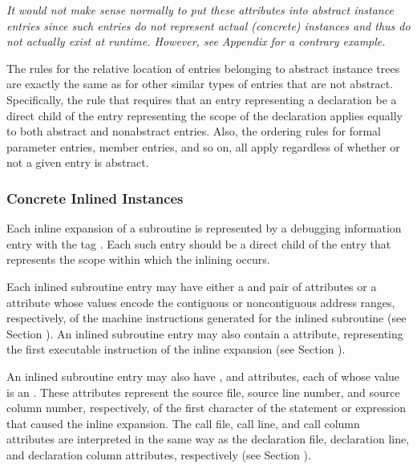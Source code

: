 \textit{It would not make sense normally to put these attributes into
abstract instance entries since such entries do not represent
actual (concrete) instances and thus do not actually exist at
run\dash time.  However, 
see Appendix  
for a contrary example.}

The rules for the relative location of entries belonging to
abstract instance trees are exactly the same as for other
similar types of entries that are not abstract. Specifically,
the rule that requires that an entry representing a declaration
be a direct child of the entry representing the scope of the
declaration applies equally to both abstract and non\dash abstract
entries. Also, the ordering rules for formal parameter entries,
member entries, and so on, all apply regardless of whether
or not a given entry is abstract.

\subsubsection{Concrete Inlined Instances}
\label{chap:concreteinlinedinstances}

Each inline expansion of a subroutine is represented
by a debugging information entry with the 
tag \DWTAGinlinedsubroutineTARG. 
Each such entry should be a direct
child of the entry that represents the scope within which
the inlining occurs.

Each inlined subroutine entry may have either a 
\DWATlowpc{}
and \DWAThighpc{} pair 
of 
attributes 
or 
a 
\DWATranges{}
attribute whose values encode the contiguous or non\dash contiguous
address ranges, respectively, of the machine instructions
generated for the inlined subroutine (see 
Section ). 
An
\hypertarget{chap:DWATentrypcentryaddressofinlinedsubprogram}{}
inlined subroutine entry may 
also 
contain 
a 
\DWATentrypc{}
attribute, representing the first executable instruction of
the inline expansion (see 
Section ).

An inlined 
\hypertarget{chap:DWATcalllinelinenumberofinlinedsubroutinecall}{}
subroutine 
\hypertarget{chap:DWATcallcolumncolumnpositionofinlinedsubroutinecall}{}
entry 
\hypertarget{chap:DWATcallfilefilecontaininginlinedsubroutinecall}{}
may also have \DWATcallfileDEFN,
\DWATcalllineDEFN{} and \DWATcallcolumnDEFN{} attributes,
each of whose
value is an . 
These attributes represent the
source file, source line number, and source column number,
respectively, of the first character of the statement or
expression that caused the inline expansion. The call file,
call line, and call column attributes are interpreted in
the same way as the declaration file, declaration line, and
declaration column attributes, respectively (see 
Section ).

